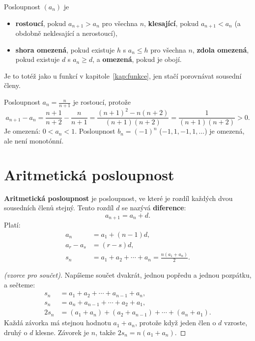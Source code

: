 \begin{definitionbox}
  Posloupnost $(a_n)$ je
  \begin{itemize}
    \item \textbf{rostoucí}, pokud $a_{n+1} > a_n$ pro všechna $n$, \textbf{klesající}, pokud $a_{n+1} < a_n$ (a obdobně neklesající a nerostoucí),
    \item \textbf{shora omezená}, pokud existuje $h$ s $a_n\leq h$ pro všechna $n$, \textbf{zdola omezená}, pokud existuje $d$ s $a_n\geq d$, a \textbf{omezená}, pokud je obojí.
  \end{itemize}
  Je to totéž jako u funkcí v kapitole~\ref{kap:funkce}, jen stačí porovnávat sousední členy.
\end{definitionbox}

\begin{example}
  Posloupnost $a_n = \frac{n}{n + 1}$ je rostoucí, protože
  \begin{equation*}
    a_{n+1} - a_n = \frac{n + 1}{n + 2} - \frac{n}{n + 1} = \frac{{(n + 1)}^2 - n(n + 2)}{(n + 1)(n + 2)} = \frac{1}{(n + 1)(n + 2)} > 0.
  \end{equation*}
  Je omezená: $0 < a_n < 1$. Posloupnost $b_n = {(-1)}^n$ ($-1, 1, -1, 1, \ldots$) je omezená, ale není monotónní.
\end{example}

\section{Aritmetická posloupnost}\label{sec:aritmeticka-posloupnost}

\begin{definitionbox}
  \textbf{Aritmetická posloupnost} je posloupnost, ve které je rozdíl každých dvou sousedních členů stejný. Tento rozdíl $d$ se nazývá \textbf{diference}:
  \begin{equation*}
    a_{n+1} = a_n + d.
  \end{equation*}
  Platí:
  \begin{align*}
    a_n &= a_1 + (n - 1)d,\\
    a_r - a_s &= (r - s)d,\\
    s_n &= a_1 + a_2 + \cdots + a_n = \frac{n(a_1 + a_n)}{2}.
  \end{align*}
\end{definitionbox}

\begin{proof}[(vzorce pro součet)]
  Napíšeme součet dvakrát, jednou popředu a jednou pozpátku, a sečteme:
  \begin{align*}
    s_n &= a_1 + a_2 + \cdots + a_{n-1} + a_n,\\
    s_n &= a_n + a_{n-1} + \cdots + a_2 + a_1,\\
    2s_n &= (a_1 + a_n) + (a_2 + a_{n-1}) + \cdots + (a_n + a_1).
  \end{align*}
  Každá závorka má stejnou hodnotu $a_1 + a_n$, protože když jeden člen o $d$ vzroste, druhý o $d$ klesne. Závorek je $n$, takže $2s_n = n(a_1 + a_n)$.
\end{proof}

